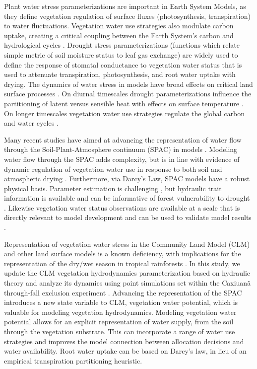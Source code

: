 \documentclass[draft,linenumbers]{agujournal}
\begin{document}
Plant water stress parameterizations are important in Earth System Models, as they define vegetation regulation of surface fluxes (photosynthesis, transpiration) to water fluctuations.
Vegetation water use strategies also modulate carbon uptake, creating a critical coupling between the Earth System's carbon and hydrological cycles \citep{green2017}.
Drought stress parameterizations (functions which relate simple metric of soil moisture status to leaf gas exchange) are widely used to define the response of stomatal conductance to vegetation water status that is used to attenuate transpiration, photosynthesis, and root water uptake with drying.
The dynamics of water stress in models have broad effects on critical land surface processes \citep{joetzjer2014}.
On diurnal timescales drought parameterizations influence the partitioning of latent versus sensible heat with effects on surface temperature \citep{bonan2014}.
On longer timescales vegetation water use strategies regulate the global carbon and water cycles \citep{dekauwe2015}.

Many recent studies have aimed at advancing the representation of water flow through the Soil-Plant-Atmosphere continuum (SPAC) in models \citep{xu2016,christoffersen2016,sperry2017}.
Modeling water flow through the SPAC adds complexity, but is in line with evidence of dynamic regulation of vegetation water use in response to both soil and atmospheric drying \citep{sperry2015}.
Furthermore, via Darcy's Law, SPAC models have a robust physical basis.
Parameter estimation is challenging \citep{drake2017}, but hydraulic trait information is available \citep{kattge2011,anderegg2015a} and can be informative of forest vulnerability to drought \citep{choat2012}.
Likewise vegetation water status observations are available at a scale that is directly relevant to model development \citep{konings2016,grant2016} and can be used to validate model results \citep{momen2017,konings2017b}.

Representation of vegetation water stress in the Community Land Model (CLM) and other land surface models is a known deficiency, with implications for the representation of the dry/wet season in tropical rainforests \citep{powell2013,ukkola2016}.
In this study, we update the CLM vegetation hydrodynamics parameterization based on hydraulic theory and
analyze its dynamics using point simulations set within the Caxiuan\~a through-fall exclusion experiment \citep{fisher2006}.
Advancing the representation of the SPAC introduces a new state variable to CLM, vegetation water potential, 
which is valuable for modeling vegetation hydrodynamics.
Modeling vegetation water potential allows for an explicit representation of water supply, from the soil through the vegetation substrate.
This can incorporate a range of water use strategies and improves the model connection between allocation decisions and water availability.
Root water uptake can be based on Darcy's law, in lieu of an empirical transpiration partitioning heuristic.
\end{document}
